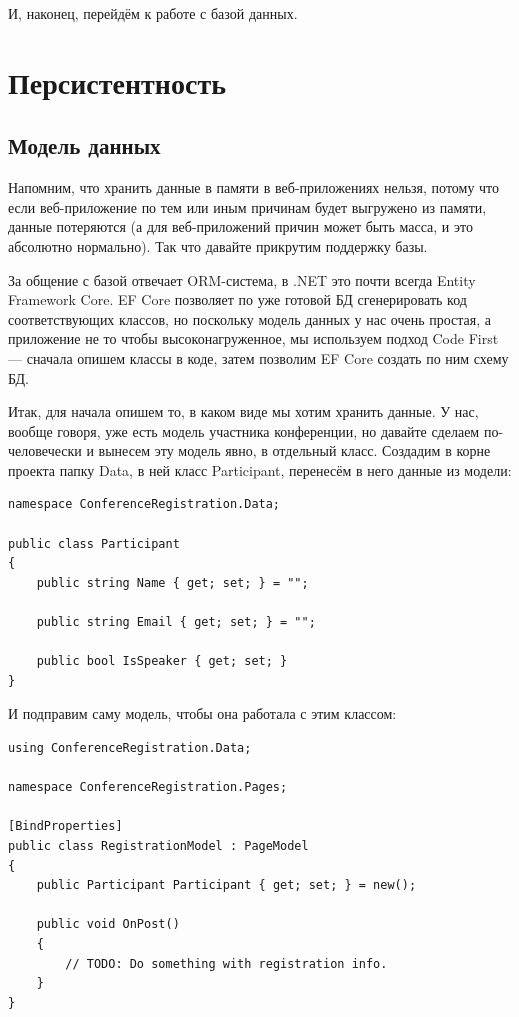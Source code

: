 \documentclass[a5paper]{article}
\begin{document}
И, наконец, перейдём к работе с базой данных.

\section{Персистентность}

\subsection{Модель данных}

Напомним, что хранить данные в памяти в веб-приложениях нельзя, потому что если веб-приложение по тем или иным причинам будет выгружено из памяти, данные потеряются (а для веб-приложений причин может быть масса, и это абсолютно нормально). Так что давайте прикрутим поддержку базы. 

За общение с базой отвечает ORM-система, в .NET это почти всегда Entity Framework Core. EF Core позволяет по уже готовой БД сгенерировать код соответствующих классов, но поскольку модель данных у нас очень простая, а приложение не то чтобы высоконагруженное, мы используем подход Code First --- сначала опишем классы в коде, затем позволим EF Core создать по ним схему БД.

Итак, для начала опишем то, в каком виде мы хотим хранить данные. У нас, вообще говоря, уже есть модель участника конференции, но давайте сделаем по-человечески и вынесем эту модель явно, в отдельный класс. Создадим в корне проекта папку Data, в ней класс Participant, перенесём в него данные из модели:

\begin{verbatim}
namespace ConferenceRegistration.Data;

public class Participant
{
    public string Name { get; set; } = "";

    public string Email { get; set; } = "";

    public bool IsSpeaker { get; set; }
}
\end{verbatim}

И подправим саму модель, чтобы она работала с этим классом:

\begin{verbatim}
using ConferenceRegistration.Data;

namespace ConferenceRegistration.Pages;

[BindProperties]
public class RegistrationModel : PageModel
{
    public Participant Participant { get; set; } = new();

    public void OnPost()
    {
        // TODO: Do something with registration info.
    }
}
\end{verbatim}
\end{document}
